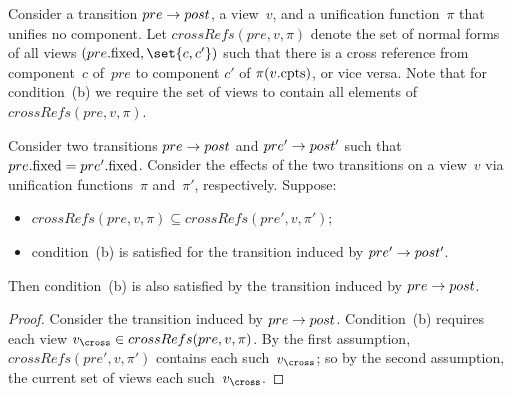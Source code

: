 \begin{definition}
Consider a transition $pre \stackrel{}\rightarrow post$, a view~$v$, and a unification
function~$\pi$ that unifies no component.  Let $crossRefs(pre, v, \pi)$ denote
the set of normal forms of all views $(pre.\fixed, \set{c, c'})$ such that
there is a cross reference from component~$c$ of~$pre$ to component $c'$ of
$\pi(v.\mathrm{cpts})$, or vice versa.  Note that for condition~(b) we require the set
of views to contain all elements of $crossRefs(pre, v, \pi)$.
\end{definition}


\begin{lemma}
\label{lem:singleRef-condition-b-opt}
Consider two transitions $pre \stackrel{}\rightarrow post$ and $pre' \stackrel{}\rightarrow post'$ such
that $pre.\mathrm{fixed} = pre'.\mathrm{fixed}$.  
Consider the effects of the two transitions on a view~$v$ via unification
functions~$\pi$ and~$\pi'$, respectively.
Suppose:
%
\begin{itemize}
\item $crossRefs(pre, v, \pi) \subseteq crossRefs(pre', v, \pi')$;

\item condition~(b) is satisfied for the transition induced by $pre' \stackrel{}\rightarrow
  post'$.
\end{itemize}
%
Then condition~(b) is also satisfied by the transition induced by $pre
\stackrel{}\rightarrow post$.
\end{lemma}
%
\begin{proof}
Consider the transition induced by $pre \stackrel{}\rightarrow post$.  Condition~(b)
requires each view $v_\cross \in crossRefs(pre, v, \pi)$.
By the first assumption, $crossRefs(pre', v, \pi')$
contains each such~$v_\cross$;
so by the second assumption, the current set of views each such~$v_\cross$.
\end{proof}



